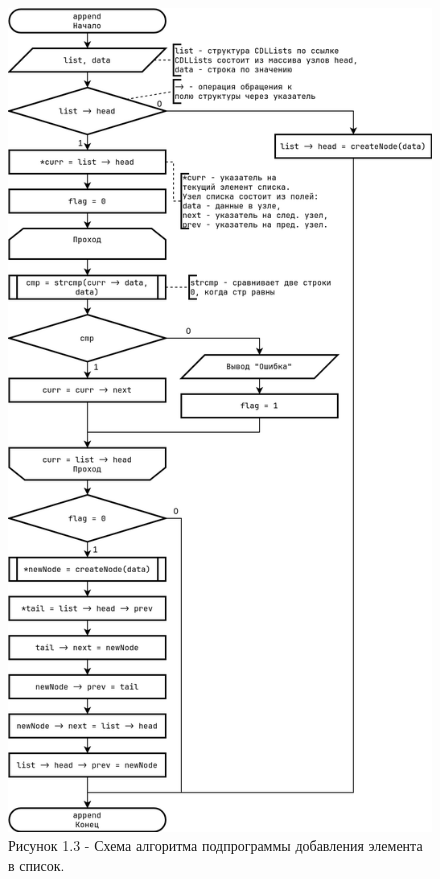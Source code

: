 \documentclass[oneside,a4paper,14pt]{extarticle}
\begin{document}
\clearpage
\begin{figure}[H]
	\centering
	\includegraphics[height=0.9\textheight]{pics/flowchart3.png}
	\caption*{Рисунок 1.3 - Схема алгоритма подпрограммы добавления элемента в список.}
\end{figure}
\end{document}
